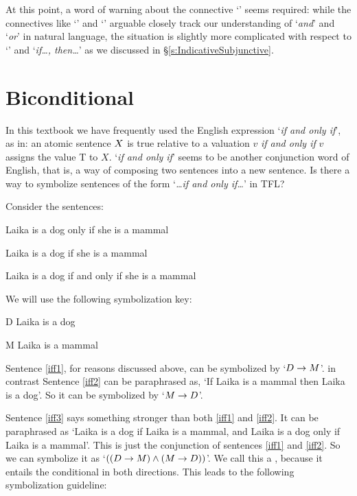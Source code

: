 \noindent At this point, a word of warning about the connective `\eif'  seems required: while the connectives like `\eand' and `\eor' arguable closely track our understanding of `\emph{and}' and `\emph{or}' in natural language, the situation is slightly more complicated with respect to `\eif' and `\emph{if\ldots, then\ldots}' as we discussed in \S\ref{s:IndicativeSubjunctive}.

\section{Biconditional}
In this textbook we have frequently used the English expression `\emph{if and only if}', as in: an atomic sentence $X$ is true relative to a valuation $v$ \emph{if and only if} $v$ assigns the value T to $X$. `\emph{if and only if}' seems to be another conjunction word of English, that is, a way of composing two sentences into a new sentence. Is there a way to symbolize sentences of the form `\emph{\ldots if and only if\ldots}' in TFL?

Consider the sentences:
	\begin{earg}
		\item[\ex{iff1}] Laika is a dog only if she is a mammal
		\item[\ex{iff2}] Laika is a dog if she is a mammal
		\item[\ex{iff3}] Laika is a dog if and only if she is a mammal
	\end{earg}
We will use the following symbolization key:
	\begin{ekey}
		\item[D] Laika is a dog
		\item[M] Laika is a mammal
	\end{ekey}
Sentence \ref{iff1}, for reasons discussed above, can be symbolized by `$D \rightarrow M$'. in contrast Sentence \ref{iff2} can be paraphrased as, `If Laika is a mammal then Laika is a dog'. So it can be symbolized by `$M \rightarrow D$'.

Sentence \ref{iff3} says something stronger than both \ref{iff1} and \ref{iff2}. It can be paraphrased as `Laika is a dog if Laika is a mammal, and Laika is a dog only if Laika is a mammal'. This is just the conjunction of sentences \ref{iff1} and \ref{iff2}. So we can symbolize it as `$((D \rightarrow M) \mathbin{\wedge} (M \rightarrow D))$'. We call this a , because it entails the conditional in both directions. This leads to the following symbolization guideline:

